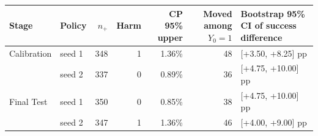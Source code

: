 \begin{tabular}{llrrrrl}
\toprule
Stage & Policy & $n_+$ & Harm & CP 95\% upper & Moved among $Y_0{=}1$ & Bootstrap 95\% CI of success difference\\
\midrule
Calibration & seed 1 & 348 & 1 & 1.36\% & 48 & [+3.50, +8.25] pp\\
 & seed 2 & 337 & 0 & 0.89\% & 36 & [+4.75, +10.00] pp\\
Final Test & seed 1 & 350 & 0 & 0.85\% & 38 & [+4.75, +10.00] pp\\
 & seed 2 & 347 & 1 & 1.36\% & 46 & [+4.00, +9.00] pp\\
\bottomrule
\end{tabular}
